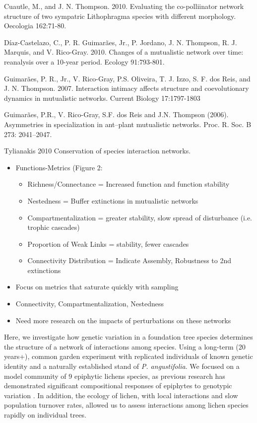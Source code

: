 \documentclass[fleqn,10pt]{wlscirep}
\begin{document}
Cuautle, M., and J. N. Thompson. 2010. Evaluating the co-polliinator
network structure of two sympatric Lithophragma species with different
morphology. Oecologia 162:71-80.

Díaz-Castelazo, C., P. R. Guimarães, Jr., P. Jordano, J. N. Thompson,
R. J. Marquis, and V. Rico-Gray. 2010. Changes of a mutualistic
network over time: reanalysis over a 10-year period. Ecology
91:793-801.


Guimarães, P. R., Jr., V. Rico-Gray, P.S. Oliveira, T. J. Izzo,
S. F. dos Reis, and J. N. Thompson. 2007. Interaction intimacy affects
structure and coevolutionary dynamics in mutualistic networks. Current
Biology 17:1797-1803

Guimarães, P.R., V. Rico-Gray, S.F. dos Reis and J.N. Thompson
(2006). Asymmetries in specialization in ant–plant mutualistic
networks. Proc. R. Soc. B 273: 2041–2047.


Tylianakis 2010 Conservation of species interaction networks.
\begin{itemize}
\item Functions-Metrics (Figure 2: 
  \begin{itemize}
  \item Richness/Connectance = Increased function and function
    stability
  \item Nestedness = Buffer extinctions in mutualistic networks
  \item Compartmentalization = greater stability, slow spread of
    disturbance (i.e. trophic cascades)
  \item Proportion of Weak Links = stability, fewer cascades
  \item Connectivity Distribution = Indicate Assembly, Robustness to
    2nd extinctions
  \end{itemize}
\item Focus on metrics that saturate quickly with sampling
\item Connectivity, Compartmentalization, Nestedness
\item Need more research on the impacts of perturbations on these
  networks
\end{itemize}




Here, we investigate how genetic variation in a foundation tree
species determines the structure of a network of interactions among
species. Using a long-term (20 years+), common garden experiment with
replicated individuals of known genetic identity and a naturally
established stand of \textit{P. angustifolia}. We focused on a model
community of 9 epiphytic lichens species, as previous research has
demonstrated significant compositional responses of epiphytes to
genotypic variation \cite{Winfree2011, Zytynska2011}. In addition, the
ecology of lichen, with local interactions and slow population
turnover rates, allowed us to assess interactions among lichen species
rapidly on individual trees.
\end{document}

